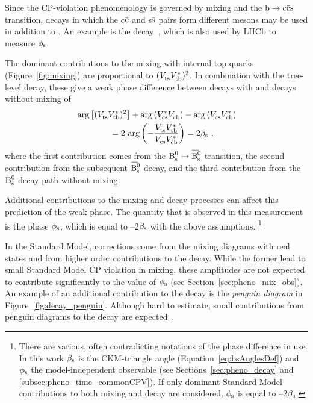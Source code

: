 Since the CP-violation phenomenology is governed by \BsBsbar{} mixing and the $\btoccs$ transition, decays in which the c$\qbar[c]$ and
s$\qbar[s]$ pairs form different mesons may be used in addition to \BstoJpsiphi. An example is the \BstoJpsipipi{}
decay~\cite{Stone:2008ak}, which is also used by LHCb to measure $\phi_\text{s}$.

The dominant contributions to the \BsBsbar{} mixing with internal top quarks (Figure~\ref{fig:mixing}) are proportional to
$(\Vts\Vtb[*])^2$. In combination with the tree-level decay, these give a weak phase difference between decays with and decays without
mixing of
\begin{equation}
  \label{eq:betasCKM}
  \begin{split}
    &\arg\left[(\Vts\Vtb[*])^2\right] + \arg\left(\Vcs[*]\Vcb\right) - \arg\left(\Vcs\Vcb[*]\right) \\
    &\qquad\qquad= 2\,\arg\left(-\frac{\Vts\Vtb[*]}{\Vcs\Vcb[*]}\right) = 2\bs
    \ ,
  \end{split}
\end{equation}
where the first contribution comes from the $\Bs\to\Bsbar$ transition, the second contribution from the subsequent $\Bsbar$ decay, and the
third contribution from the $\text{B}_\text{s}^\text{0}$ decay path without mixing.

Additional contributions to the mixing and decay processes can affect this prediction of the weak phase. The quantity that is observed in
this measurement is the phase $\phi_\text{s}$, which is equal to --2$\beta_\text{s}$ with the above assumptions.%
\footnote{There are various, often contradicting notations of the phase difference in use. In this work $\beta_\text{s}$ is the CKM-triangle angle
(Equation~\ref{eq:bsAnglesDef}) and $\phi_\text{s}$ the model-independent observable (see Sections~\ref{sec:pheno_decay} and
\ref{subsec:pheno_time_commonCPV}). If only dominant Standard Model contributions to both mixing and decay are considered, $\phi_\text{s}$ is equal
to --2$\beta_\text{s}$.}

In the Standard Model, corrections come from the mixing diagrams with real states and from higher order contributions to the decay.  While
the former lead to small Standard Model CP violation in mixing, these amplitudes are not expected to contribute significantly to the value
of $\phi_\text{s}$ (see Section~\ref{sec:pheno_mix_obs}). An example of an additional contribution to the decay is the \emph{penguin diagram} in
Figure~\ref{fig:decay_penguin}. Although hard to estimate, small contributions from penguin diagrams to the decay are
expected~\cite{Faller:2008gt,*Bhattacharya:2012ph}.

